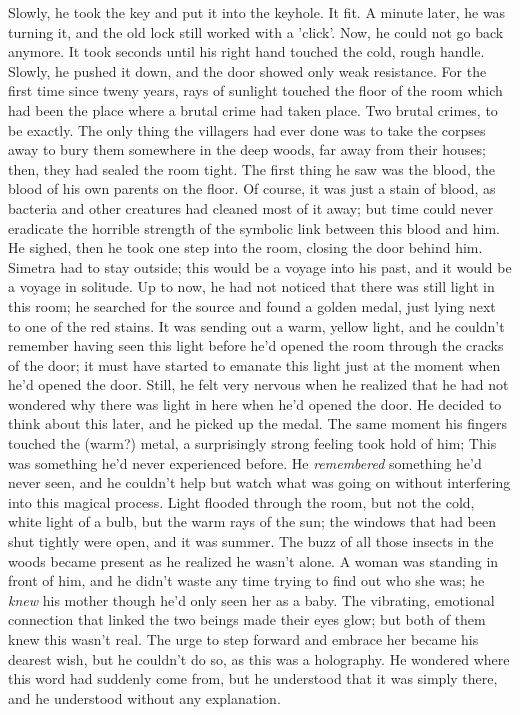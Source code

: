 Slowly, he took the key and put it into the keyhole. 
It fit. 
A minute later, he was turning it, and the old lock still worked with a 'click'. Now, he could not go back anymore. 
It took seconds until his right hand touched the cold, rough handle. Slowly, he pushed it down, and the door showed only weak resistance. 
For the first time since tweny years, rays of sunlight touched the floor of the room which had been the place where a brutal crime had taken place. Two brutal crimes, to be exactly. The only thing the villagers had ever done was to take the corpses away to bury them somewhere in the deep woods, far away from their houses; then, they had sealed the room tight. 
The first thing he saw was the blood, the blood of his own parents on the floor. Of course, it was just a stain of blood, as bacteria and other creatures had cleaned most of it away; but time could never eradicate the horrible strength of the symbolic link between this blood and him. 
He sighed, then he took one step into the room, closing the door behind him. Simetra had to stay outside; this would be a voyage into his past, and it would be a voyage in solitude. 
Up to now, he had not noticed that there was still light in this room; he searched for the source and found a golden medal, just lying next to one of the red stains. It was sending out a warm, yellow light, and he couldn't remember having seen this light before he'd opened the room through the cracks of the door; it must have started to emanate this light just at the moment when he'd opened the door. Still, he felt very nervous when he realized that he had not wondered why there was light in here when he'd opened the door. 
He decided to think about this later, and he picked up the medal. The same moment his fingers touched the (warm?) metal, a surprisingly strong feeling took hold of him; This was something he'd never experienced before. He \emph{remembered} something he'd never seen, and he couldn't help but watch what was going on without interfering into this magical process. 
Light flooded through the room, but not the cold, white light of a bulb, but the warm rays of the sun; the windows that had been shut tightly were open, and it was summer. The buzz of all those insects in the woods became present as he realized he wasn't alone. 
A woman was standing in front of him, and he didn't waste any time trying to find out who she was; he \emph{knew} his mother though he'd only seen her as a baby. The vibrating, emotional connection that linked the two beings made their eyes glow; but both of them knew this wasn't real. The urge to step forward and embrace her became his dearest wish, but he couldn't do so, as this was a holography. He wondered where this word had suddenly come from, but he understood that it was simply there, and he understood without any explanation. 
